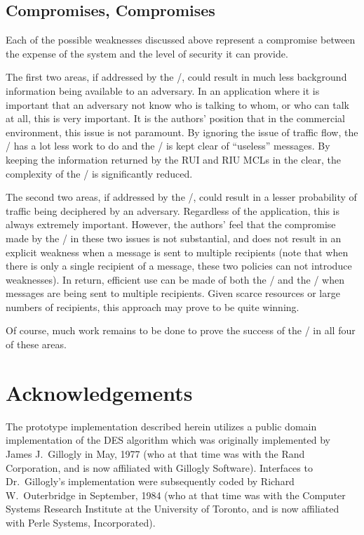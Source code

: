 \subsection{Compromises, Compromises}
Each of the possible weaknesses discussed above represent a compromise
between the expense of the system and the level of security it can provide.

The first two areas, if addressed by the \TMA/,
could result in much less background information being available to an
adversary.
In an application where it is important that an adversary not know who is
talking to whom,
or who can talk at all,
this is very important.
It is the authors' position that in the commercial environment,
this issue is not paramount.
By ignoring the issue of traffic flow,
the \TMA/ has a lot less work to do and the \MTS/ is kept clear of
``useless'' messages.
By keeping the information returned by the RUI and RIU MCLs in the clear,
the complexity of the \TMA/ is significantly reduced.

The second two areas, if addressed by the \TMA/,
could result in a lesser probability of traffic being deciphered by an
adversary.
Regardless of the application,
this is always extremely important.
However,
the authors' feel that the compromise made by the \TMA/ in these two issues
is not substantial,
and does not result in an explicit weakness when a message is sent to
multiple recipients
(note that when there is only a single recipient of a message,
these two policies can not introduce weaknesses).
In return, efficient use can be made of both the \MTS/ and the \TMA/ when
messages are being sent to multiple recipients.
Given scarce resources or large numbers of recipients,
this approach may prove to be quite winning.

Of course, much work remains to be done to prove the success of the \TMA/ in
all four of these areas.

\section{Acknowledgements}
The prototype implementation described herein utilizes a public domain
implementation of the DES algorithm\cite{DEA}
which was originally implemented by James J.~Gillogly in May, 1977
(who at that time was with the Rand Corporation,
and is now affiliated with Gillogly Software).
Interfaces to Dr.~Gillogly's implementation were subsequently coded by
Richard W.~Outerbridge in September, 1984
(who at that time was with the Computer Systems Research Institute
at the University of Toronto,
and is now affiliated with Perle Systems, Incorporated).


